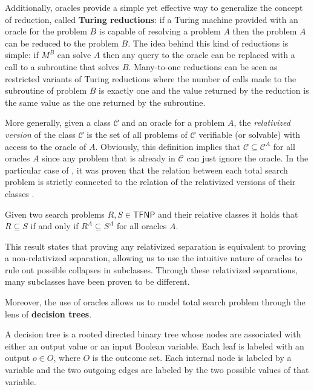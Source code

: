 Additionally, oracles provide a simple yet effective way to generalize the concept of reduction, called \textbf{Turing reductions}: if a Turing machine provided with an oracle for the problem $B$ is capable of resolving a problem $A$ then the problem $A$ can be reduced to the problem $B$. The idea behind this kind of reductions is simple: if $M^B$ can solve $A$ then any query to the oracle can be replaced with a call to a subroutine that solves $B$. Many-to-one reductions can be seen as restricted variants of Turing reductions where the number of calls made to the subroutine of problem $B$ is exactly one and the value returned by the reduction is the same value as the one returned by the subroutine.

More generally, given a class $\mathcal{C}$ and an oracle for a problem $A$, the \textit{relativized version} of the class $\mathcal{C}$ is the set of all problems of $\mathcal{C}$ verifiable (or solvable) with access to the oracle of $A$. Obviously, this definition implies that $\mathcal{C} \subseteq \mathcal{C}^A$ for all oracles $A$ since any problem that is already in $\mathcal{C}$ can just ignore the oracle. In the particular case of \TFNP, it was proven that the relation between each total search problem is strictly connected to the relation of the relativized versions of their classes \cite{rel_comp_np_search}.

\begin{theorem}
    Given two search problems $R,S \in \mathsf{TFNP}$ and their relative classes it holds that $R \subseteq S$ if and only if $R^A \subseteq S^A$ for all oracles $A$.
\end{theorem}

This result states that proving any relativized separation is equivalent to proving a non-relativized separation, allowing us to use the intuitive nature of oracles to rule out possible collapses in \TFNP subclasses. Through these relativized separations, many \TFNP subclasses have been proven to be different.

Moreover, the use of oracles allows us to model total search problem through the lens of \textbf{decision trees}.

\begin{definition}
    A decision tree is a rooted directed binary tree whose nodes are associated with either an output value or an input Boolean variable. Each leaf is labeled with an output $o \in O$, where $O$ is the outcome set. Each internal node is labeled by a variable and the two outgoing edges are labeled by the two possible values of that variable.
\end{definition}

